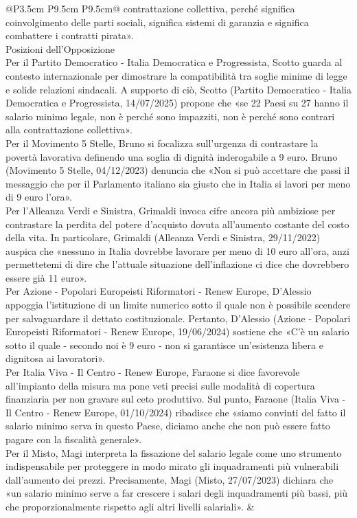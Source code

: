 \documentclass[a4paper,11pt]{article}
\begin{document}
\begin{landscape}
\begin{longtable}{@{}P{3.5cm} P{9.5cm} P{9.5cm}@{}}
contrattazione collettiva, perché significa coinvolgimento delle parti sociali, significa sistemi di garanzia e significa combattere i contratti pirata».\\[6pt] Posizioni dell'Opposizione\\[6pt] Per il Partito Democratico - Italia Democratica e Progressista, Scotto guarda al contesto internazionale per dimostrare la compatibilità tra soglie minime di legge e solide relazioni sindacali. A supporto di ciò, Scotto (Partito Democratico - Italia Democratica e Progressista, 14/07/2025) propone che «se 22 Paesi su 27 hanno il salario minimo legale, non è perché sono impazziti, non è perché sono contrari alla contrattazione collettiva».\\[6pt] Per il Movimento 5 Stelle, Bruno si focalizza sull'urgenza di contrastare la povertà lavorativa definendo una soglia di dignità inderogabile a 9 euro. Bruno (Movimento 5 Stelle, 04/12/2023) denuncia che «Non si può accettare che passi il messaggio che per il Parlamento italiano sia giusto che in Italia si lavori per meno di 9 euro l'ora».\\[6pt] Per l'Alleanza Verdi e Sinistra, Grimaldi invoca cifre ancora più ambiziose per contrastare la perdita del potere d'acquisto dovuta all'aumento costante del costo della vita. In particolare, Grimaldi (Alleanza Verdi e Sinistra, 29/11/2022) auspica che «nessuno in Italia dovrebbe lavorare per meno di 10 euro all'ora, anzi permettetemi di dire che l'attuale situazione dell'inflazione ci dice che dovrebbero essere già 11 euro».\\[6pt] Per Azione - Popolari Europeisti Riformatori - Renew Europe, D'Alessio appoggia l'istituzione di un limite numerico sotto il quale non è possibile scendere per salvaguardare il dettato costituzionale. Pertanto, D'Alessio (Azione - Popolari Europeisti Riformatori - Renew Europe, 19/06/2024) sostiene che «C'è un salario sotto il quale - secondo noi è 9 euro - non si garantisce un'esistenza libera e dignitosa ai lavoratori».\\[6pt] Per Italia Viva - Il Centro - Renew Europe, Faraone si dice favorevole all'impianto della misura ma pone veti precisi sulle modalità di copertura finanziaria per non gravare sul ceto produttivo. Sul punto, Faraone (Italia Viva - Il Centro - Renew Europe, 01/10/2024) ribadisce che «siamo convinti del fatto il salario minimo serva in questo Paese, diciamo anche che non può essere fatto pagare con la fiscalità generale».\\[6pt] Per il Misto, Magi interpreta la fissazione del salario legale come uno strumento indispensabile per proteggere in modo mirato gli inquadramenti più vulnerabili dall'aumento dei prezzi. Precisamente, Magi (Misto, 27/07/2023) dichiara che «un salario minimo serve a far crescere i salari degli inquadramenti più bassi, più che proporzionalmente rispetto agli altri livelli salariali». & \\

\end{longtable}
\end{landscape}
\end{document}

